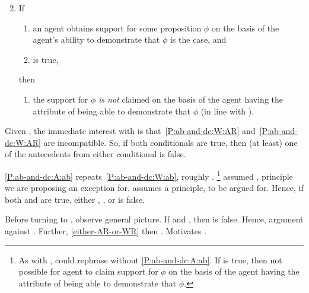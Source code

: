 \begin{note}[Conditional B]
  \begin{proposition}[\mcB{}]
    \begin{enumerate}[label=(C\Alph*), ref=(C\Alph*)]
      \setcounter{enumi}{1}
    \item\label{P:ab-and-dc:A} If
      \begin{enumerate}[label=(\roman*), ref=(CB.\roman*)]
      \item\label{P:ab-and-dc:A:ab} an agent obtains support for some proposition \(\phi\) on the basis of the agent's ability to demonstrate that \(\phi\) is the case, and
      \item\label{P:ab-and-dc:A:ni} \nI{} is true,
      \end{enumerate}
      then
      \begin{enumerate}[label=(\roman*), ref=(CB.\roman*), resume]
      \item\label{P:ab-and-dc:A:AR} the support for \(\phi\) \emph{is not} claimed on the basis of the agent having the attribute of being able to demonstrate that \(\phi\) (in line with \AR{}).
      \end{enumerate}
    \end{enumerate}
  \end{proposition}
\end{note}

\begin{note}
  Given \mcA{}, the immediate interest with \mcB{} is that~\ref{P:ab-and-dc:W:AR} and~\ref{P:ab-and-dc:W:AR} are incompatible.
  So, if both conditionals are true, then (at least) one of the antecedents from either conditional is false.

  \ref{P:ab-and-dc:A:ab} repeats~\ref{P:ab-and-dc:W:ab}, roughly \eA{}.\nolinebreak
  \footnote{
    As with \mcA{}, could rephrase without \ref{P:ab-and-dc:A:ab}.
    If \nI{} is true, then not possible for agent to claim support for \(\phi\) on the basis of the agent having the attribute of being able to demonstrate that \(\phi\).
  }
  \mcA{} assumed \uRa{}, principle we are proposing an exception for.
  \mcB{} assumes a principle, \nI{} to be argued for.
  Hence, if both \mcA{} and \mcB{} are true, either \eA{}, \uRa{}, or \nI{} is false.

  Before turning to \nI{}, observe general picture.
  If \eA{} and \nI{}, then \uRa{} is false.
  Hence, argument against \uRa{}.
  Further, \ref{either-AR-or-WR} then \WR{}.
  Motivates \rC{}.
\end{note}



